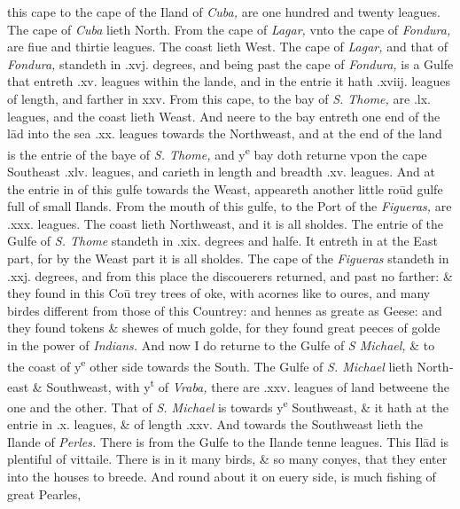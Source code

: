 \documentclass[11pt,twoside]{article}\makeatletter
\begin{document}
 this cape to the cape of the Iland of {\itshape Cuba,} are one hundred and twenty leagues. The cape of {\itshape Cuba} lieth North. From the cape of {\itshape Lagar,} vnto the cape of {\itshape Fondura,} are fiue and thirtie leagues. The coast lieth West. The cape of {\itshape Lagar,} and that of 
	\normalmarginpar
       {\itshape Fondura,} standeth in .xvj. degrees, and being past the cape of {\itshape Fondura,} is a Gulfe that entreth .xv. leagues within the lande, and in the entrie it hath .xviij. leagues of length, and farther in xxv. From this cape, to the bay of {\itshape S. Thome,} are .lx. leagues, and the coast lieth Weast. And neere to the bay entreth one end of 
	\normalmarginpar
       the lād into the sea .xx. leagues towards the Northweast, and at the end of the land is the entrie of the baye of {\itshape S. Thome,} and y\textsuperscript{e} bay doth returne vpon the cape Southeast .xlv. leagues, and carieth in length and breadth .xv. leagues. And at the entrie in of this gulfe towards the Weast, appeareth another little roūd gulfe full of small Ilands. From the mouth of this gulfe, to the Port of the {\itshape Figueras,} are .xxx. leagues. The coast lieth North­weast, and it is all sholdes. The entrie of the Gulfe of {\itshape S. Thome} standeth in .xix. degrees and halfe. It entreth in at the East part, for by the Weast part it is all sholdes. The cape of the {\itshape Fi­gueras} standeth in .xxj. degrees, and from this place the disco­uerers 
	\normalmarginpar
       returned, and past no farther: \& they found in this Coū ­trey trees of oke, with acornes like to oures, and many birdes different from those of this Countrey: and hennes as greate as Geese: and they found tokens \& shewes of much golde, for they found great peeces of golde in the power of {\itshape Indians.} And now I do returne to the Gulfe of {\itshape S Michael,} \& to the coast of y\textsuperscript{e} other 
	\normalmarginpar
       side towards the South. The Gulfe of {\itshape S. Michael} lieth North­east \& Southweast, with y\textsuperscript{t} of {\itshape Vraba,} there are .xxv. leagues of land betweene the one and the other. That of {\itshape S. Michael} is to­wards y\textsuperscript{e} Southweast, \& it hath at the entrie in .x. leagues, \& of length .xxv. And towards the Southweast lieth the Ilande of {\itshape Perles.} There is from the Gulfe to the Ilande tenne leagues. 
	\normalmarginpar
       This Ilād is plentiful of vittaile. There is in it many birds, \& so many conyes, that they enter into the houses to breede. And round about it on euery side, is much fishing of great Pearles, %
\end{document}
